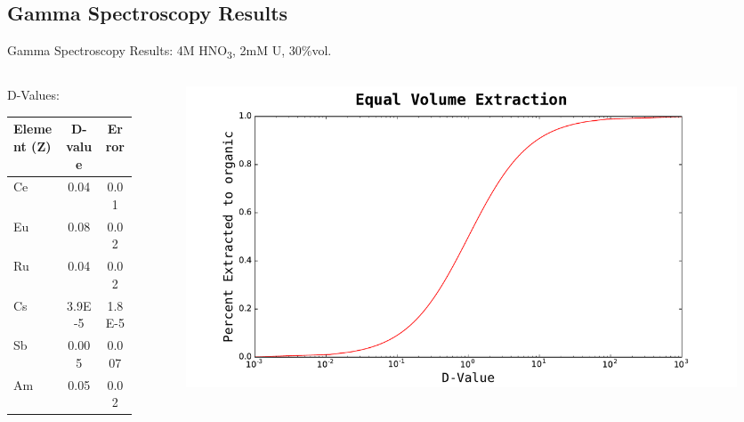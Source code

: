 \documentclass{beamer}
\newcommand{\tsbs}{\textsubscript}
\begin{document}
\subsection{Gamma Spectroscopy Results}
\begin{frame}{\small Gamma Spectroscopy Results: 4M HNO\tsbs{3}, 2mM U, 30\%vol.}

  \begin{columns}
    \begin{column}{0.4\textwidth}
  \vspace{-0.6cm}
  \begin{block}{D-Values:}
    \begin{center}
      \vskip -0.2cm
  {\fontsize{7}{11.2}\selectfont
  \begin{tabular}{l  c  c}\toprule
   Element (Z)  & D-value & Error\\ \midrule 
   Ce & 0.04 & 0.01  \\
   Eu & 0.08  & 0.02   \\
   Ru & 0.04  & 0.02  \\
   Cs & 3.9E-5 & 1.8E-5  \\
   Sb & 0.005   & 0.007   \\
   Am & 0.05   & 0.02  \\ \bottomrule
  \end{tabular}
  }
  \end{center}
  \end{block}
    \end{column}
    \begin{column}{0.7\textwidth}
      \begin{figure}[H]
        \vspace*{-1cm}
        \begin{center}
	  \includegraphics[scale = 0.3]{figures/D_Value_vs_Percent_Extraction_log}
	\end{center}
      \end{figure}
    \end{column}
  \end{columns}
\end{frame}
\end{document}
